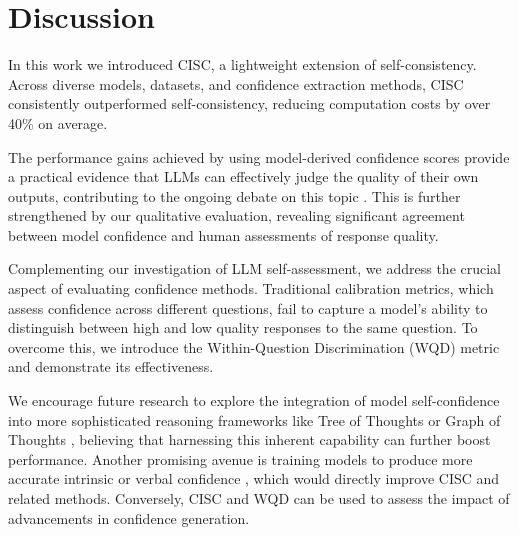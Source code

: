 \section{Discussion}

In this work we introduced CISC, a lightweight extension of self-consistency. Across diverse models, datasets, and confidence extraction methods, CISC consistently outperformed self-consistency, reducing computation costs by over 40\% on average.

The performance gains achieved by using model-derived confidence scores provide a practical evidence that LLMs can effectively judge the quality of their own outputs, contributing to the ongoing debate on this topic \cite{huang2023large, li2024confidence}. This is further strengthened by our qualitative evaluation, revealing significant agreement between model confidence and human assessments of response quality.

Complementing our investigation of LLM self-assessment, we address the crucial aspect of evaluating confidence methods.  Traditional calibration metrics, which assess confidence across different questions, fail to capture a model's ability to distinguish between high and low quality responses to the same question. To overcome this, we introduce the Within-Question Discrimination (WQD) metric and demonstrate its effectiveness.

We encourage future research to explore the integration of model self-confidence into more sophisticated reasoning frameworks like Tree of Thoughts \cite{yao2024tree} or Graph of Thoughts \cite{besta2024graph}, believing that harnessing this inherent capability can further boost performance. Another promising avenue is training models to produce more accurate intrinsic or verbal confidence \cite{lin2022teaching, chaudhry2024finetuning}, which would directly improve CISC and related methods. Conversely, CISC and WQD can be used to assess the impact of advancements in confidence generation.